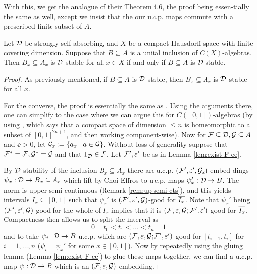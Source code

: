 \documentclass[12pt]{amsart}
\begin{document}
  With this, we get the analogue of their Theorem 4.6, the proof being essen\hyp{}tially the same as well, except we insist that the our u.c.p. maps commute with a prescribed finite subset of $A$. 
  
\begin{prop}
Let $\mathcal{D}$ be strongly self-absorbing, and $X$ be a compact Hausdorff space with finite covering dimension. Suppose that $B \subseteq A$ is a unital inclusion of $C(X)$-algebras. Then $B_x \subseteq A_x$ is $\mathcal{D}$-stable for all $x \in X$ if and only if $B \subseteq A$ is $\mathcal{D}$-stable. 
          \begin{proof}
            As previously mentioned, if $B \subseteq A$ is $\mathcal{D}$-stable, then $B_x \subseteq A_x$ is $\mathcal{D}$-stable for all $x$.

            For the converse, the proof is essentially the same as \cite[Theorem 4.6]{HirshbergRordamWinter07}. Using the arguments there, one can simplify to the case where we can argue this for $C([0,1])$-algebras (by using \cite[Theorem V.3]{HurewiczWallman}, which says that a compact space of dimension $\leq n$ is homeomorphic to a subset of $[0,1]^{2n+1}$, and then working component-wise). Now for $\mathcal{F} \subseteq \mathcal{D}, \mathcal{G} \subseteq A$ and  $\ee > 0$, let $\mathcal{G}_x := \{a_x \mid a \in \mathcal{G}\}$. Without loss of generality suppose that $\mathcal{F}^*=\mathcal{F},\mathcal{G}^*=\mathcal{G}$ and that $1_{\mathcal{D}} \in \mathcal{F}$. Let $\mathcal{F}',\varepsilon'$ be as in Lemma \ref{lem:exist-F-ee}. 
            
            By $\mathcal{D}$-stability of the inclusion $B_x \subseteq A_x$ there are u.c.p. $(\mathcal{F}',\varepsilon',\mathcal{G}_x)$-embed\hyp{}dings $\psi_x: \mathcal{D} \to B_x \subseteq A_x$ which lift by Choi-Effros to u.c.p. maps $\psi_x': \mathcal{D} \to B$. The norm is upper semi-continuous (Remark \ref{rem:up-semi-cts}), and this yields intervals $I_x \subseteq [0,1]$ such that $\psi_x'$ is $(\mathcal{F}',\varepsilon',\mathcal{G})$-good for $\overline{I_x}$.  Note that $\psi_x'$ being $(\mathcal{F}',\varepsilon',\mathcal{G})$-good for the whole of $I_x$ implies that it is $(\mathcal{F},\varepsilon,\mathcal{G};\mathcal{F}',\varepsilon')$-good for $\overline{I_x}$.  
             Compactness then allows us to split the interval as
\begin{equation}
            0 = t_0 < t_1 < \dots < t_n = 1
\end{equation}
            and to take $\psi_i: \mathcal{D} \to B$ u.c.p.  which are $(\mathcal{F},\varepsilon,\mathcal{G};\mathcal{F}',\varepsilon')$-good for $[t_{i-1},t_i]$ for $i=1,\dots,n$ ($\psi_i = \psi_x'$ for some $x \in [0,1]$). Now by repeatedly using the gluing lemma (Lemma \ref{lem:exist-F-ee}) to glue these maps together, we can find a u.c.p. map $\psi: \mathcal{D} \to B$ which is an $(\mathcal{F},\varepsilon,\mathcal{G})$-embedding. 
          \end{proof}
\end{prop}
\end{document}
